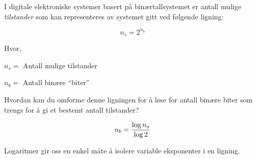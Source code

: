 

I digitale elektroniske systemer basert på binærtallsystemet er antall mulige {\it tilstander} som kan representeres av systemet gitt ved følgende ligning:

$$n_s = 2^{n_b}$$

\noindent
Hvor,

$n_s =$ Antall mulige tilstander

$n_b =$ Antall binære ``biter''

\vskip 10pt

Hvordan kan du omforme denne ligningen for å løse for antall binære biter som trengs for å gi et bestemt antall tilstander?







$$n_b = {\log n_s \over \log 2}$$







Logaritmer gir oss en enkel måte å isolere variable eksponenter i en ligning.



